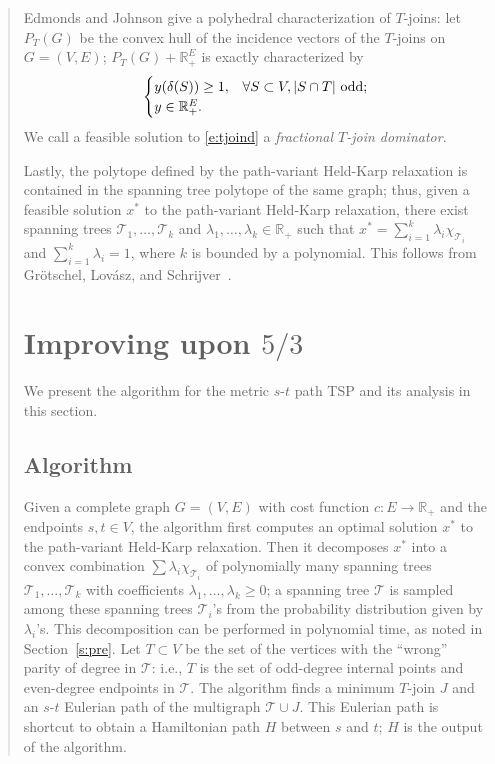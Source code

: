 \documentclass[11pt,letterpaper]{article}
\newcommand{\st}{\mbox{$s$-$t$} }
\begin{document}
\begin{quote}
Edmonds and Johnson \cite{EJ} give a polyhedral characterization of $T$-joins: let $P_T(G)$ be the convex hull of the incidence vectors of the $T$-joins on $G=(V,E)$; $P_T(G)+\mathbb{R}_+^E$ is exactly characterized by
\begin{equation}\label{e:tjoind}
\begin{cases}
y(\delta(S))\geq 1 ,&\forall S\subset V , |S\cap T|\textnormal{ odd};\\
y\in \mathbb{R}_+^E .&
\end{cases}
\end{equation}
We call a feasible solution to \eqref{e:tjoind} a \emph{fractional $T$-join dominator}.

Lastly, the polytope defined by the path-variant Held-Karp relaxation is contained in the spanning tree polytope of the same graph; thus, given a feasible solution $x^*$ to the path-variant Held-Karp relaxation, there exist spanning trees $\mathscr{T}_1,\ldots,\mathscr{T}_k$ and $\lambda_1,\ldots,\lambda_k\in\mathbb{R}_+$ such that $x^*=\sum_{i=1}^k \lambda_i\chi_{\mathscr{T}_i}$ and $\sum_{i=1}^k\lambda_i=1$, where $k$ is bounded by a polynomial. This follows from Gr{\"o}tschel, Lov{\'a}sz, and Schrijver~\cite{GLS}.

\section{Improving upon $5/3$}\label{s:improv}

We present the algorithm for the metric \st path TSP and its analysis in this section.

\subsection{Algorithm}

Given a complete graph $G=(V,E)$ with cost function $c:E\to\mathbb{R}_+$ and the endpoints $s,t\in V$, the algorithm first computes an optimal solution $x^*$ to the path-variant Held-Karp relaxation. Then it decomposes $x^*$ into a convex combination $\sum\lambda_i\chi_{\mathscr{T}_i}$ of polynomially many spanning trees $\mathscr{T}_1,\ldots,\mathscr{T}_k$ with coefficients $\lambda_1,\ldots,\lambda_k\geq 0$; a spanning tree $\mathscr{T}$ is sampled among these spanning trees $\mathscr{T}_i$'s from the probability distribution given by $\lambda_i$'s. This decomposition can be performed in polynomial time, as noted in Section~\ref{s:pre}. Let $T\subset V$ be the set of the vertices with the ``wrong'' parity of degree in $\mathscr{T}$: i.e., $T$ is the set of odd-degree internal points and even-degree endpoints in $\mathscr{T}$. The algorithm finds a minimum $T$-join $J$ and an \st Eulerian path of the multigraph $\mathscr{T}\cup J$. This Eulerian path is shortcut to obtain a Hamiltonian path $H$ between $s$ and $t$; $H$ is the output of the algorithm.


\end{quote}
\end{document}
